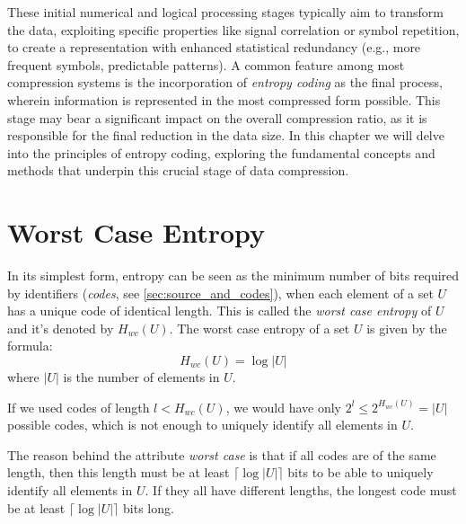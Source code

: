 \noindent These initial numerical and logical processing stages typically aim to transform the data, exploiting specific properties like signal correlation or symbol repetition, to create a representation with enhanced statistical redundancy (e.g., more frequent symbols, predictable patterns). A common feature among most compression systems is the incorporation of \emph{entropy coding} as the final process, wherein information is represented in the most compressed form possible. This stage may bear a significant impact on the overall compression ratio, as it is responsible for the final reduction in the data size. In this chapter we will delve into the principles of entropy coding, exploring the fundamental concepts and methods that underpin this crucial stage of data compression.

\section*{Worst Case Entropy}
In its simplest form, entropy can be seen as the minimum number of bits required by identifiers (\emph{codes}, see \autoref{sec:source_and_codes}), when each element of a set $U$ has a unique code of identical length. This is called the \emph{worst case entropy} of $U$ and it's denoted by $H_{wc}(U)$. The worst case entropy of a set $U$ is given by the formula:
\begin{equation}
    H_{wc}(U) =  \log |U|
\end{equation}
where $|U|$ is the number of elements in $U$.

\begin{remark}
    If we used codes of length $l < H_{wc} (U)$, we would have only $2^l \leq 2^{H_{wc}(U)} = |U|$ possible codes, which is not enough to uniquely identify all elements in $U$.
\end{remark}

\noindent The reason behind the attribute \emph{worst case} is that if all codes are of the same length, then this length must be at least $\lceil \log |U| \rceil$ bits to be able to uniquely identify all elements in $U$. If they all have different lengths, the longest code must be at least $\lceil \log |U| \rceil$ bits long.

